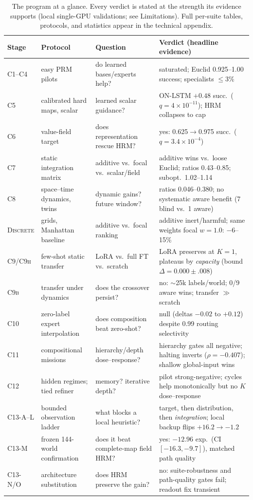\documentclass[letterpaper]{article} %
\newcommand{\stage}[1]{\textsc{#1}}
\begin{document}
\begin{table}[t]
\centering
\footnotesize
\begin{tabular}{@{}p{1.5cm}p{3.3cm}p{3.6cm}p{8.0cm}@{}}
\toprule
Stage & Protocol & Question & Verdict (headline evidence) \\
\midrule
\stage{C1--C4} & easy PRM pilots & do learned bases/experts help? & saturated; Euclid 0.925--1.00 success; specialists $\leq$3\% \\
\stage{C5} & calibrated hard maps, scalar & learned scalar guidance? & ON-LSTM $+0.48$ succ.\ ($q{=}4{\times}10^{-11}$); HRM collapses to cap \\
\stage{C6} & value-field target & does representation rescue HRM? & yes: 0.625$\to$0.975 succ.\ ($q{=}3.4{\times}10^{-4}$) \\
\stage{C7} & static integration matrix & additive vs.\ focal vs.\ scalar/field & additive wins vs.\ loose Euclid; ratios 0.43--0.85; subopt.\ 1.02--1.14 \\
\stage{C8} & space--time dynamics, twins & dynamic gains? future window? & ratios 0.046--0.380; no systematic aware benefit (7 blind vs.\ 1 aware) \\
\stage{Discrete} & grids, Manhattan baseline & additive vs.\ focal ranking & additive inert/harmful; same weights focal $w{=}1.0$: $-$6--15\% \\
\stage{C9/C9h} & few-shot static transfer & LoRA vs.\ full FT vs.\ scratch & LoRA preserves at $K{=}1$, plateaus by \emph{capacity} (bound $\Delta{=}0.000{\pm}.008$) \\
\stage{C9b} & transfer under dynamics & does the crossover persist? & no: $\sim$25k labels/world; 0/9 aware wins; transfer $\gg$ scratch \\
\stage{C10} & zero-label expert interpolation & does composition beat zero-shot? & null (deltas $-0.02$ to $+0.12$) despite 0.99 routing selectivity \\
\stage{C11} & compositional missions & hierarchy/depth dose--response? & hierarchy gates all negative; halting inverts ($\rho{=}-0.407$); shallow global-input wins \\
\stage{C12} & hidden regimes; tied refiner & memory? iterative depth? & pilot strong-negative; cycles help monotonically but no $K$ dose--response \\
\stage{C13-A--L} & bounded observation ladder & what blocks a local heuristic? & target, then distribution, then \emph{integration}; local backup flips $+16.2\to-1.2$ \\
\stage{C13-M} & frozen 144-world confirmation & does it beat complete-map field HRM? & yes: $-12.96$ exp.\ (CI $[-16.3,-9.7]$), matched path quality \\
\stage{C13-N/O} & architecture substitution & does HRM preserve the gain? & no: suite-robustness and path-quality gates fail; readout fix transient \\
\bottomrule
\end{tabular}
\caption{The program at a glance. Every verdict is stated at the strength its evidence supports (local single-GPU validations; see Limitations). Full per-suite tables, protocols, and statistics appear in the technical appendix.}
\label{tab:matrix}
\end{table}
\end{document}

